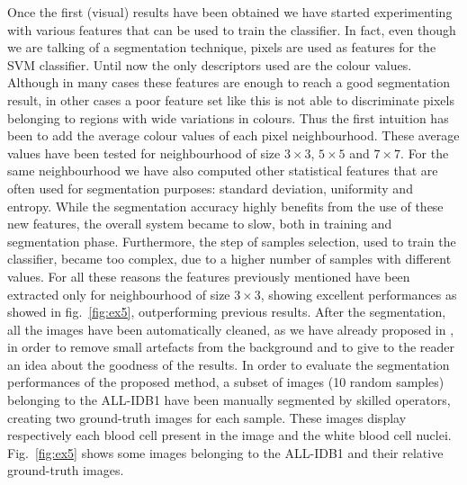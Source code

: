 \documentclass[final,a4paper,12pt,english]{UnicaPhdThesis3}
\begin{document}
	Once the first (visual) results have been obtained we have started experimenting with various features that can be used to train the classifier.
	In fact, even though we are talking of a segmentation technique, pixels are used as features for the SVM classifier. Until now the only descriptors used are the colour values. Although in many cases these features are enough to reach a good segmentation result, in other cases a poor feature set like this is not able to discriminate pixels belonging to regions with wide variations in colours. Thus the first intuition has been to add the average colour values of each pixel neighbourhood. These average values have been tested for neighbourhood of size $3 \times 3$, $5 \times 5$ and $7 \times 7$. For the same neighbourhood we have also computed other statistical features that are often used for segmentation purposes: standard deviation, uniformity and entropy. While the segmentation accuracy highly benefits from the use of these new features, the overall system became to slow, both in training and segmentation phase. Furthermore, the step of samples selection, used to train the classifier, became too complex, due to a higher number of samples with different values. For all these reasons the features previously mentioned have been extracted only for neighbourhood of size $3 \times 3$, showing excellent performances as showed in fig.~\ref{fig:ex5}, outperforming previous results. After the segmentation, all the images have been automatically cleaned, as we have already proposed in \cite{putzu}, in order to remove small artefacts from the background and to give to the reader an idea about the goodness of the results. 
	In order to evaluate the segmentation performances of the proposed method, a subset of images (10 random samples) belonging to the ALL-IDB1 have been manually segmented by skilled operators, creating two ground-truth images for each sample. These images display respectively each blood cell present in the image and the white blood cell nuclei. Fig.~\ref{fig:ex5} shows some images belonging to the ALL-IDB1 and their relative ground-truth images.
\end{document}
